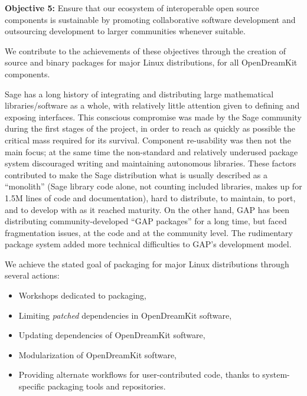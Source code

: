 \textbf{Objective 5:} Ensure that our ecosystem of interoperable open
source components is sustainable by promoting collaborative software
development and outsourcing development to larger communities whenever
suitable.

We contribute to the achievements of these objectives through the
creation of source and binary packages for major Linux distributions,
for all OpenDreamKit components.

Sage has a long history of integrating and distributing large
mathematical libraries/software as a whole, with relatively little
attention given to defining and exposing interfaces. This conscious
compromise was made by the Sage community during the first stages of the
project, in order to reach as quickly as possible the critical mass
required for its survival. Component re-usability was then not the main
focus; at the same time the non-standard and relatively underused
package system discouraged writing and maintaining autonomous libraries.
These factors contributed to make the Sage distribution what is usually
described as a ``monolith'' (Sage library code alone, not counting
included libraries, makes up for 1.5M lines of code and documentation),
hard to distribute, to maintain, to port, and to develop with as it
reached maturity. On the other hand, GAP has been distributing
community-developed ``GAP packages'' for a long time, but faced
fragmentation issues, at the code and at the community level. The
rudimentary package system added more technical difficulties to GAP's
development model.

We achieve the stated goal of packaging for major Linux distributions
through several actions:

\begin{itemize}
\tightlist
\item
  Workshops dedicated to packaging,
\item
  Limiting \emph{patched} dependencies in OpenDreamKit software,
\item
  Updating dependencies of OpenDreamKit software,
\item
  Modularization of OpenDreamKit software,
\item
  Providing alternate workflows for user-contributed code, thanks to
  system-specific packaging tools and repositories.
\end{itemize}
